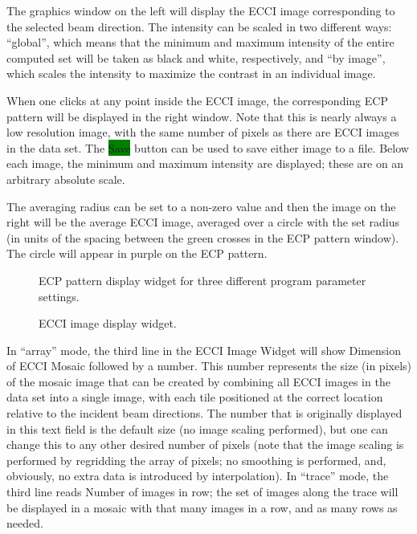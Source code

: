 \documentclass[DIV=calc, paper=letter, fontsize=11pt]{scrartcl}	 %
\newcommand{\button}[1]{\colorbox{green}{\textsf{#1}} button}
\begin{document}
The graphics window on the left will display the ECCI image corresponding to the selected beam direction.  The intensity can be scaled in two different
ways: ``global'', which means that the minimum and maximum intensity of the entire computed set will be taken as black and white, respectively, and 
``by image'', which scales the intensity to maximize the contrast in an individual image.

When one clicks at any point inside the ECCI image, the corresponding ECP pattern will be displayed in the right window.  Note that this is 
nearly always a low resolution image, with the same number of pixels as there are ECCI images in the data set.  The \button{Save} can be used to
save either image to a file.  Below each image, the minimum and maximum intensity are displayed; these are on an arbitrary absolute scale.

The averaging radius can be set to a non-zero value and then the image on the right will be the average ECCI image, averaged over a circle with 
the set radius (in units of the spacing between the green crosses in the ECP pattern window).  The circle will appear in purple on the ECP pattern.

\begin{figure}[h]
\leavevmode\centering
\epsfxsize=5in
\caption{\label{fig:widget2}ECP pattern display widget for three different program parameter settings.}
\end{figure}

\begin{figure}[h]
\leavevmode\centering
\epsfxsize=3in
\caption{\label{fig:widget3}ECCI image display widget.}
\end{figure}

In ``array'' mode, the third line in the ECCI Image Widget will show \textsf{Dimension of ECCI Mosaic} followed by a number.  This number
represents the size (in pixels) of the mosaic image that can be created by combining all ECCI images in the data set into a single image,
with each tile positioned at the correct location relative to the incident beam directions.  The number that is originally displayed in 
this text field is the default size (no image scaling performed), but one can change this to any other desired number of pixels (note that
the image scaling is performed by regridding the array of pixels; no smoothing is performed, and, obviously, no extra data is introduced 
by interpolation).  In ``trace'' mode, the third line reads \textsf{Number of images in row}; the set of images along the trace will be 
displayed in a mosaic with that many images in a row, and as many rows as needed.
\end{document}
